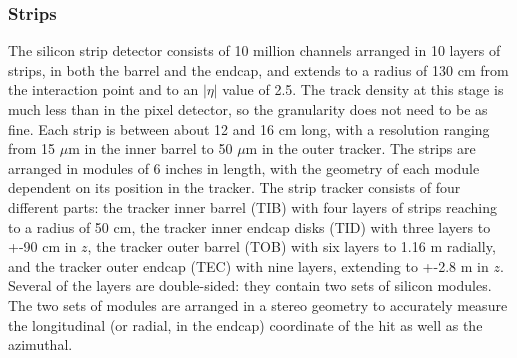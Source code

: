 \subsubsection{Strips}
\label{exp:strips}
The silicon strip detector consists of 10 million channels
arranged in 10 layers of strips, 
in both the barrel and the endcap,
and extends to a radius of 130 cm from the interaction point
and to an $|\eta|$ value of 2.5.  
The track density at this stage is much less than in the pixel detector,
so the granularity does not need to be as fine.
Each strip is between about 12 and 16 cm long,
with a resolution ranging from 
15 $\mu$m in the inner barrel
to %
50 $\mu$m in the outer tracker.  
The strips are arranged in modules of 6 inches in length, 
with the geometry of each module dependent 
on its position in the tracker.  
The strip tracker consists of four different parts: 
the tracker inner barrel (TIB) with four layers of strips reaching to a radius of 50 cm, 
the tracker inner endcap disks (TID) with three layers to +-90 cm in $z$, 
the tracker outer barrel (TOB) with six layers to 1.16 m radially, 
and the tracker outer endcap (TEC) with nine layers, extending to +-2.8 m in $z$. 
Several of the layers are double-sided: 
they contain two sets of silicon modules.  
The two sets of modules are arranged in a stereo
geometry to accurately measure the longitudinal
(or radial, in the endcap) coordinate of the hit 
as well as the azimuthal.  


